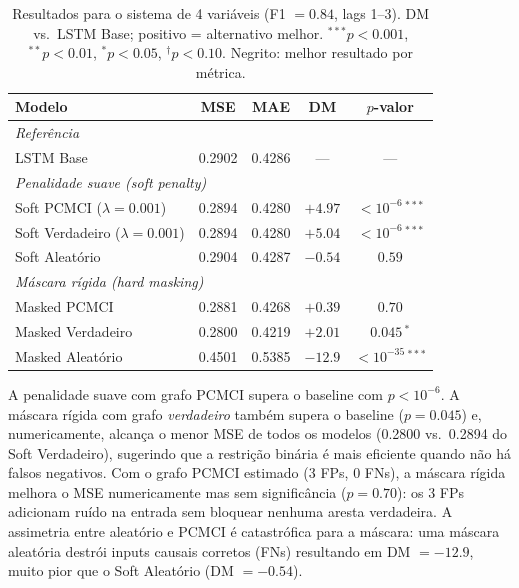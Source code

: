\documentclass[12pt, a4paper]{article}
\begin{document}
\begin{table}[H]
\centering
\caption{Resultados para o sistema de 4 variáveis (F1 $= 0.84$, lags 1--3). DM vs.\ LSTM Base; positivo = alternativo melhor. $^{***}p{<}0.001$, $^{**}p{<}0.01$, $^{*}p{<}0.05$, $^{\dagger}p{<}0.10$. Negrito: melhor resultado por métrica.}
\label{tab:results_4var}
\begin{tabular}{lcccc}
\toprule
Modelo & MSE & MAE & DM & $p$-valor \\
\midrule
\multicolumn{5}{l}{\textit{Referência}} \\
LSTM Base                                    & 0.2902 & 0.4286 & — & — \\
\midrule
\multicolumn{5}{l}{\textit{Penalidade suave (soft penalty)}} \\
Soft PCMCI ($\lambda=0.001$)                 & 0.2894 & 0.4280 & $+4.97$ & $<\!10^{-6}$\,$^{***}$ \\
Soft Verdadeiro ($\lambda=0.001$)            & 0.2894 & 0.4280 & $+5.04$ & $<\!10^{-6}$\,$^{***}$ \\
Soft Aleatório                               & 0.2904 & 0.4287 & $-0.54$ & $0.59$ \\
\midrule
\multicolumn{5}{l}{\textit{Máscara rígida (hard masking)}} \\
Masked PCMCI                                 & 0.2881 & 0.4268 & $+0.39$ & $0.70$ \\
Masked Verdadeiro                   & 0.2800 & 0.4219 & $+2.01$ & $0.045$\,$^{*}$ \\
Masked Aleatório                             & 0.4501 & 0.5385 & $-12.9$ & $<\!10^{-35}$\,$^{***}$ \\
\bottomrule
\end{tabular}
\end{table}

A penalidade suave com grafo PCMCI supera o baseline com $p < 10^{-6}$. A máscara rígida com grafo \emph{verdadeiro} também supera o baseline ($p = 0.045$) e, numericamente, alcança o menor MSE de todos os modelos (0.2800 vs.\ 0.2894 do Soft Verdadeiro), sugerindo que a restrição binária é mais eficiente quando não há falsos negativos. Com o grafo PCMCI estimado (3 FPs, 0 FNs), a máscara rígida melhora o MSE numericamente mas sem significância ($p = 0.70$): os 3 FPs adicionam ruído na entrada sem bloquear nenhuma aresta verdadeira. A assimetria entre aleatório e PCMCI é catastrófica para a máscara: uma máscara aleatória destrói inputs causais corretos (FNs) resultando em DM $= -12.9$, muito pior que o Soft Aleatório (DM $= -0.54$).
\end{document}
